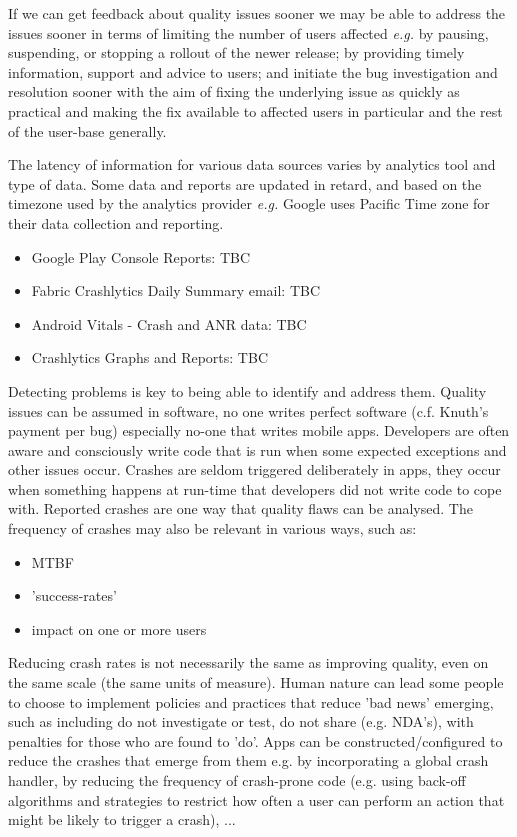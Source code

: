 If we can get feedback about quality issues sooner we may be able to address the issues sooner in terms of limiting the number of users affected \emph{e.g.} by pausing, suspending, or stopping a rollout of the newer release; by providing timely information, support and advice to users; and initiate the bug investigation and resolution sooner with the aim of fixing the underlying issue as quickly as practical and making the fix available to affected users in particular and the rest of the user-base generally.

The latency of information for various data sources varies by analytics tool and type of data. Some data and reports are updated in retard, and based on the timezone used by the analytics provider \emph{e.g.} Google uses Pacific Time zone for their data collection and reporting. 

\begin{itemize}
    \item Google Play Console Reports: TBC
    \item Fabric Crashlytics Daily Summary email: TBC
    \item Android Vitals - Crash and ANR data: TBC
    \item Crashlytics Graphs and Reports: TBC
\end{itemize}

Detecting problems is key to being able to identify and address them. Quality issues can be assumed in software, no one writes perfect software (c.f. Knuth's payment per bug) especially no-one that writes mobile apps. Developers are often aware and consciously write code that is run when some expected exceptions and other issues occur. Crashes are seldom triggered deliberately in apps, they occur when something happens at run-time that developers did not write code to cope with. Reported crashes are one way that quality flaws can be analysed. The frequency of crashes may also be relevant in various ways, such as:

\begin{itemize}
    \item MTBF
    \item 'success-rates'
    \item impact on one or more users
\end{itemize}{}

Reducing crash rates is not necessarily the same as improving quality, even on the same scale (the same units of measure). Human nature can lead some people to choose to implement policies and practices that reduce 'bad news' emerging, such as including do not investigate or test, do not share (e.g. NDA's), with penalties for those who are found to 'do'. Apps can be constructed/configured to reduce the crashes that emerge from them e.g. by incorporating a global crash handler, by reducing the frequency of crash-prone code (e.g. using back-off algorithms and strategies to restrict how often a user can perform an action that might be likely to trigger a crash), ...

